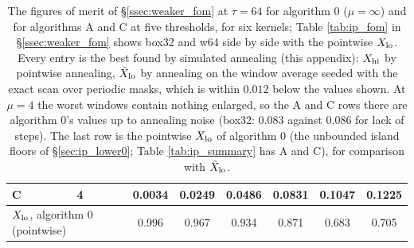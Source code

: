 \documentclass{article}
\numberwithin{equation}{section}   %
\begin{document}
\begin{table}[ht]
\begin{tabular}{ll cccccc}
C & 4   & 0.0034 & 0.0249 & 0.0486 & 0.0831 & 0.1047 & 0.1225 \\
\midrule
\multicolumn{2}{l}{$X_{\rm lo}$, algorithm 0 (pointwise)} & 0.996 & 0.967 & 0.934 & 0.871 & 0.683 & 0.705 \\
\bottomrule
\end{tabular}
\caption{The figures of merit of \S\ref{ssec:weaker_fom} at $\tau = 64$ for algorithm 0
($\mu = \infty$) and for algorithms A and C at five thresholds, for six kernels; Table \ref{tab:ip_fom} in \S\ref{ssec:weaker_fom} shows box32 and w64 side by side with the pointwise $X_{\rm lo}$.
Every entry is the best found by simulated annealing (this appendix): $X_{\rm hi}$ by pointwise
annealing, $\tilde X_{\rm lo}$ by annealing on the window average seeded with the exact scan over
periodic masks, which is within $0.012$ below the values shown.  At $\mu = 4$ the worst windows
contain nothing enlarged, so the A and C rows there are algorithm 0's values up to annealing noise
(box32: $0.083$ against $0.086$ for lack of steps).  The last row is the pointwise $X_{\rm lo}$ of
algorithm 0 (the unbounded island floors of \S\ref{sec:ip_lower0}; Table \ref{tab:ip_summary} has A and C),
for comparison with $\tilde X_{\rm lo}$.}
\label{tab:ip_fom_full}
\end{table}
\end{document}
